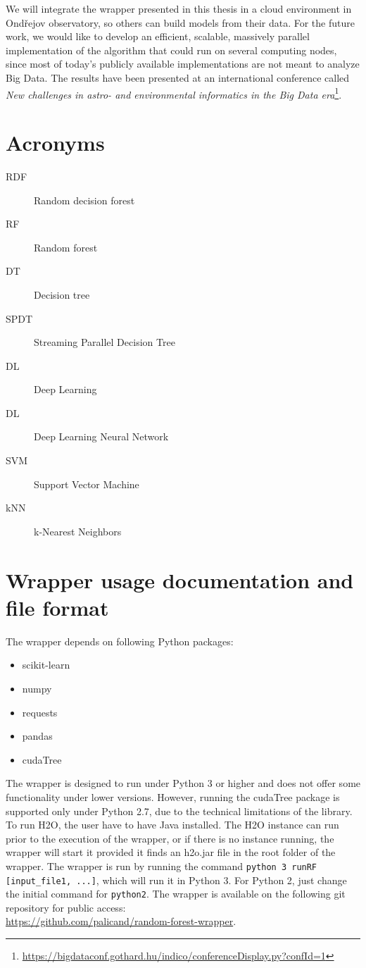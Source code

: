 \documentclass[thesis=B,english]{FITthesis}[2012/10/20]
\begin{document}
 We will integrate the wrapper presented in this thesis in a cloud environment in Ond{\v r}ejov observatory, so others can build models from their data. For the future work, we would like to develop an efficient, scalable, massively parallel implementation of the algorithm that could run on several computing nodes, since most of today's publicly available implementations are not meant to analyze Big Data. The results have been presented at an international conference called \emph{New challenges in astro- and environmental informatics in the Big Data era}\footnote{\url{https://bigdataconf.gothard.hu/indico/conferenceDisplay.py?confId=1}}.



\appendix

\chapter{Acronyms}
\begin{description}
	\item[RDF] Random decision forest
	\item[RF] Random forest
	\item[DT] Decision tree
	\item[SPDT] Streaming Parallel Decision Tree
	\item[DL] Deep Learning
	\item [DL] Deep Learning Neural Network
	\item [SVM] Support Vector Machine
	\item [kNN] k-Nearest Neighbors
\end{description}

\chapter{Wrapper usage documentation and file format}
The wrapper depends on following Python packages:
\begin{itemize}
\item scikit-learn
\item numpy
\item requests
\item pandas
\item cudaTree
\end{itemize}
The wrapper is designed to run under Python 3 or higher and does not offer some functionality under lower versions. However, running the cudaTree package is supported only under Python 2.7, due to the technical limitations of the library. To run H2O, the user have to have Java installed. The H2O instance can run prior to the execution of the wrapper, or if there is no instance running, the wrapper will start it provided it finds an h2o.jar file in the root folder of the wrapper. The wrapper is run by running the command \texttt{python 3 runRF [input\_file1, ...]}, which will run it in Python 3. For Python 2, just change the initial command for \texttt{python2}. The wrapper is available on the following git repository for public access:\\\url{https://github.com/palicand/random-forest-wrapper}.
\end{document}
